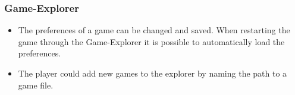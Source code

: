 \subsubsection{Game-Explorer}
\begin{itemize}

	\item The preferences of a game can be changed and saved. When restarting the game through the Game-Explorer it is possible to automatically load the preferences.

	\item The player could add new games to the explorer by naming the path to a game file.

\end{itemize}


